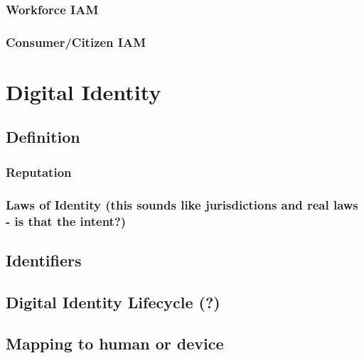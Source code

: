 \hypertarget{workforce-iam}{%
\subsection{Workforce IAM}\label{workforce-iam}}

\hypertarget{consumercitizen-iam}{%
\subsection{Consumer/Citizen IAM}\label{consumercitizen-iam}}

\hypertarget{digital-identity}{%
\chapter{Digital Identity}\label{digital-identity}}

\hypertarget{definition}{%
\section{Definition}\label{definition}}

\hypertarget{reputation}{%
\subsection{Reputation}\label{reputation}}

\hypertarget{laws-of-identity-this-sounds-like-jurisdictions-and-real-laws---is-that-the-intent}{%
\subsection{Laws of Identity (this sounds like jurisdictions and real
laws - is that the
intent?)}\label{laws-of-identity-this-sounds-like-jurisdictions-and-real-laws---is-that-the-intent}}

\hypertarget{identifiers}{%
\section{Identifiers}\label{identifiers}}

\hypertarget{digital-identity-lifecycle}{%
\section{Digital Identity Lifecycle
(?)}\label{digital-identity-lifecycle}}

\hypertarget{mapping-to-human-or-device}{%
\section{Mapping to human or
device}\label{mapping-to-human-or-device}}

